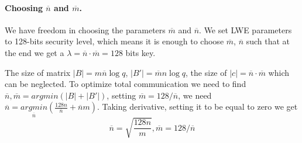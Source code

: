 \documentclass[12pt]{article}
\newcommand{\nbar}{\overline{n}}
\newcommand{\mbar}{\overline{m}}
\begin{document}
\paragraph{Choosing $\nbar$ and $\mbar$.}
We have freedom in choosing the parameters $\mbar$ and $\nbar$. We set LWE parameters to 128-bits security level, which means it is enough to choose $\mbar$, $\nbar$ such that at the end we get a $\lambda = \nbar \cdot \mbar = 128$ bits key.

The size of matrix $|B| = m \nbar \log q$, $|B'| = \mbar n \log q$, the size of $|c| = \nbar \cdot \mbar$ which can be neglected.
To optimize total communication we need to find $\nbar, \mbar = argmin(|B| + |B'|)$, setting $\mbar = 128 / \nbar$, we need $\nbar = \underset{\nbar}{argmin}(\frac{128 n}{\nbar} + \nbar m)$. Taking derivative, setting it to be equal to zero we get
\begin{equation}
\nbar = \sqrt{\frac{128n}{m}}, \mbar = 128 / \nbar
\label{eq:mbar_nbar}
\end{equation}
\end{document}
